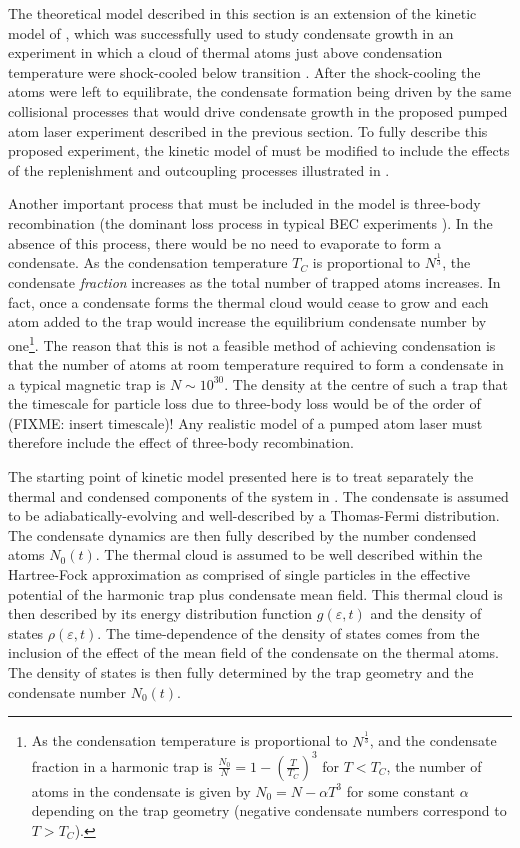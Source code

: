 The theoretical model described in this section is an extension of the kinetic model of \citet{Bijlsma:2000}, which was successfully used to study condensate growth in an experiment in which a cloud of thermal atoms just above condensation temperature were shock-cooled below transition \citep{Miesner:1998}.  After the shock-cooling the atoms were left to equilibrate, the condensate formation being driven by the same collisional processes that would drive condensate growth in the proposed pumped atom laser experiment described in the previous section.  To fully describe this proposed experiment, the kinetic model of \citeauthor{Bijlsma:2000} must be modified to include the effects of the replenishment and outcoupling processes illustrated in . 

Another important process that must be included in the model is three-body recombination (the dominant loss process in typical BEC experiments \citep{Burt:1997fk}). In the absence of this process, there would be no need to evaporate to form a condensate. As the condensation temperature $T_C$ is proportional to $N^{\frac{1}{3}}$, the condensate \emph{fraction} increases as the total number of trapped atoms increases. In fact, once a condensate forms the thermal cloud would cease to grow and each atom added to the trap would increase the equilibrium condensate number by one\footnote{As the condensation temperature is proportional to $N^{\frac{1}{3}}$, and the condensate fraction in a harmonic trap is $\displaystyle \frac{N_0}{N} = 1 - \left(\frac{T}{T_C}\right)^3$ for $T < T_C$, the number of atoms in the condensate is given by $N_0 = N - \alpha T^3$ for some constant $\alpha$ depending on the trap geometry (negative condensate numbers correspond to $T > T_C$).}. The reason that this is not a feasible method of achieving condensation is that the number of atoms at room temperature required to form a condensate in a typical magnetic trap is $N \sim 10^{30}$. The density at the centre of such a trap that the timescale for particle loss due to three-body loss would be of the order of (FIXME: insert timescale)! Any realistic model of a pumped atom laser must therefore include the effect of three-body recombination.

\parasep

The starting point of kinetic model presented here is to treat separately the thermal and condensed components of the system in . The condensate is assumed to be adiabatically-evolving and well-described by a Thomas-Fermi distribution. The condensate dynamics are then fully described by the number condensed atoms $N_0(t)$. The thermal cloud is assumed to be well described within the Hartree-Fock approximation as comprised of single particles in the effective potential of the harmonic trap plus condensate mean field. This thermal cloud is then described by its energy distribution function $g(\varepsilon, t)$ and the density of states $\rho(\varepsilon, t)$. The time-dependence of the density of states comes from the inclusion of the effect of the mean field of the condensate on the thermal atoms. The density of states is then fully determined by the trap geometry and the condensate number $N_0(t)$.

